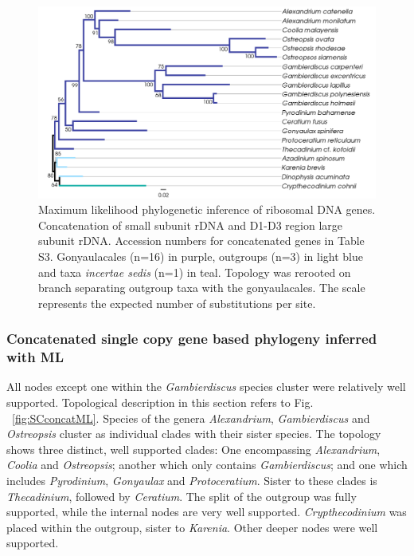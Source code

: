 \documentclass[fleqn,10pt,lineno]{wlpeerj} %
\begin{document}
\begin{figure}[ht]
\centering
\includegraphics[width=\linewidth]{gonya-figs/rDNA-ML.png} 
\caption{Maximum likelihood phylogenetic inference of ribosomal DNA genes. Concatenation of small subunit rDNA and D1-D3 region large subunit rDNA. Accession numbers for concatenated genes in Table S3. Gonyaulacales (n=16) in purple, outgroups (n=3) in light blue and taxa \textit{incertae sedis} (n=1) in teal. Topology was rerooted on branch separating outgroup taxa with the gonyaulacales. The scale represents the expected number of substitutions per site.} 
\label{fig:rdna}
\end{figure} 

\subsubsection*{Concatenated single copy gene based phylogeny inferred with ML}
All nodes except one within the \emph{Gambierdiscus} species cluster were relatively well supported. 
Topological description in this section refers to Fig. ~\ref{fig:SCconcatML}. 
Species of the genera \emph{Alexandrium}, \emph{Gambierdiscus} and \emph{Ostreopsis} cluster as individual clades with their sister species.  
The topology shows three distinct, well supported clades: 
One encompassing \emph{Alexandrium}, \emph{Coolia} and \emph{Ostreopsis}; another which only contains \emph{Gambierdiscus}; and one which includes \emph{Pyrodinium}, \emph{Gonyaulax} and \emph{Protoceratium}. 
Sister to these clades is \emph{Thecadinium}, followed by \emph{Ceratium}.
The split of the outgroup was fully supported, while the internal nodes are very well supported. 
\emph{Crypthecodinium} was placed within the outgroup, sister to \emph{Karenia}. 
Other deeper nodes were well supported.
 
\end{document}
